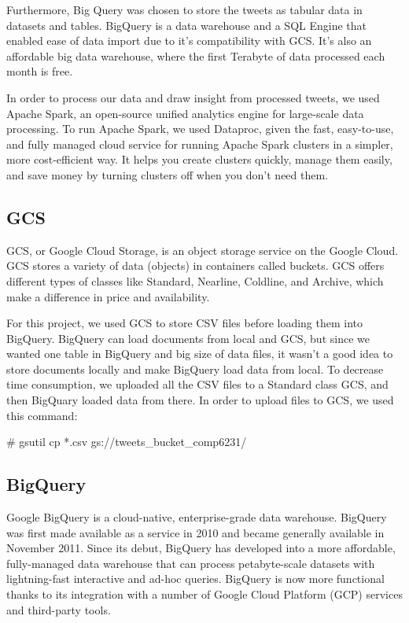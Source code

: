 \documentclass[a4paper,12pt]{article}
\begin{document}
Furthermore, Big Query was chosen to store the tweets as tabular data in datasets and tables. BigQuery is a data warehouse
and a SQL Engine that enabled ease of data import due to it's compatibility with GCS. It's also an affordable big data
warehouse, where the first Terabyte of data processed each month is free.

In order to process our data and draw insight from processed tweets, we used Apache Spark, an open-source unified analytics engine for
large-scale data processing. To run Apache Spark, we used Dataproc, given the fast, easy-to-use, and fully managed cloud
service for running Apache Spark clusters in a simpler, more cost-efficient way. It helps you create clusters quickly,
manage them easily, and save money by turning clusters off when you don't need them.

\subsection{GCS}
GCS, or Google Cloud Storage\cite{GCS}, is an object storage service on the Google Cloud. GCS stores a variety of data
(objects) in containers called buckets. GCS offers different types of classes like Standard, Nearline, Coldline, and
Archive, which make a difference in price and availability\cite{GCSClasses}.

For this project, we used GCS to store CSV files before loading them into  BigQuery. BigQuery can load documents from
local and GCS, but since we wanted one table in BigQuery and big size of data files, it wasn't a good idea to store
documents locally and make BigQuery load data from local. To decrease time consumption, we uploaded all the CSV files to
a Standard class GCS, and then BigQuary loaded data from there. In order to upload files to GCS, we used this command:

\# gsutil cp *.csv gs://tweets\_bucket\_comp6231/

\subsection{BigQuery}
Google BigQuery is a cloud-native, enterprise-grade data warehouse. BigQuery was first made available as a service in
2010 and became generally available in November 2011. Since its debut, BigQuery has developed into a more affordable,
fully-managed data warehouse that can process petabyte-scale datasets with lightning-fast interactive and ad-hoc queries.
BigQuery is now more functional thanks to its integration with a number of Google Cloud Platform (GCP) services and
third-party tools.
\end{document}
